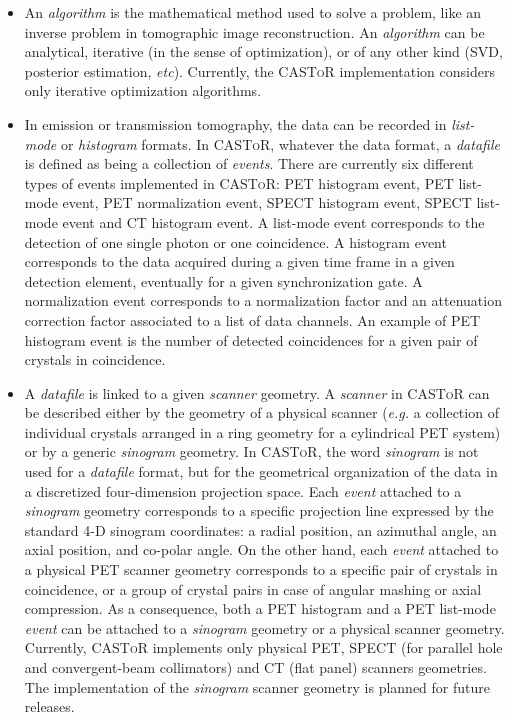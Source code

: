 \documentclass[a4paper, 11pt]{article}
\newcommand{\castor}{\textsc{CASToR}\xspace}
\begin{document}
\begin{itemize}

  \item An \textit{algorithm} is the mathematical method used to solve a problem, like an inverse problem in tomographic image reconstruction.
        An \textit{algorithm} can be analytical, iterative (in the sense of optimization), or of any other kind (SVD, posterior estimation,
        \textit{etc}). Currently, the \castor implementation considers only iterative optimization algorithms.

  \item In emission or transmission tomography, the data can be recorded in \textit{list-mode} or \textit{histogram} formats. 
        In \castor, whatever the data format, a \textit{datafile} is defined as being a collection of \textit{events}. 
        There are currently six different types of events implemented in \castor: PET histogram event, PET list-mode event, PET normalization event, SPECT histogram event, SPECT list-mode event and CT histogram event.
        A list-mode event corresponds to the detection of one single photon or one coincidence.
        A histogram event corresponds to the data acquired during a given time frame in a given detection element, eventually for a given synchronization gate.
        A normalization event corresponds to a normalization factor and an attenuation correction factor associated to a list of data channels.
        An example of PET histogram event is the number of detected coincidences for a given pair of crystals in coincidence.

  \item A \textit{datafile} is linked to a given \textit{scanner} geometry. 
        A \textit{scanner} in \castor can be described either by the geometry of a physical scanner (\textit{e.g.} a collection of individual
        crystals arranged in a ring geometry for a cylindrical PET system) or by a generic \textit{sinogram} geometry. 
        In \castor, the word \textit{sinogram} is not used for a \textit{datafile} format, but for the geometrical organization of the data
        in a discretized four-dimension projection space.
        Each \textit{event} attached to a \textit{sinogram} geometry corresponds to a specific projection line expressed by the standard 4-D sinogram
        coordinates: a radial position, an azimuthal angle, an axial position, and co-polar angle.
        On the other hand, each \textit{event} attached to a physical PET scanner geometry corresponds to a specific pair of crystals in coincidence,
        or a group of crystal pairs in case of angular mashing or axial compression. 
        As a consequence, both a PET histogram and a PET list-mode \textit{event} can be attached to a \textit{sinogram} geometry or a physical scanner geometry.
        Currently, \castor implements only physical PET, SPECT (for parallel hole and convergent-beam collimators) and CT (flat panel) scanners geometries.
        The implementation of the \textit{sinogram} scanner geometry is planned for future releases.


\end{itemize}
\end{document}

